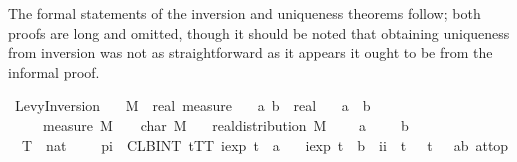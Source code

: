 \documentclass[leqno]{article}
\theoremstyle{definition}
\begin{document}
\medskip

The formal statements of the inversion and uniqueness theorems follow; both proofs are long and omitted, though it should be noted that obtaining uniqueness from inversion was not as straightforward as it appears it ought to be from the informal proof.

\medskip

\begin{isabellebody}
\isamarkupfalse%
\ Levy{\isacharunderscore}Inversion{\isacharcolon}\isanewline
\ \ \ M\ {\isacharcolon}{\isacharcolon}\ {\isachardoublequoteopen}real\ measure{\isachardoublequoteclose}\isanewline
\ \ \ a\ b\ {\isacharcolon}{\isacharcolon}\ real\isanewline
\ \ \ {\isachardoublequoteopen}a\ {\isasymle}\ b{\isachardoublequoteclose}\isanewline
\ \ \ {\isachardoublequoteopen}{\isasymmu}\ {\isasymequiv}\ measure\ M{\isachardoublequoteclose}\ \ {\isachardoublequoteopen}{\isasymphi}\ {\isasymequiv}\ char\ M{\isachardoublequoteclose}\isanewline
\ \ \ {\isachardoublequoteopen}real{\isacharunderscore}distribution\ M{\isachardoublequoteclose}\isanewline
\ \ \ {\isachardoublequoteopen}{\isasymmu}\ {\isacharbraceleft}a{\isacharbraceright}\ {\isacharequal}\ {}{\isachardoublequoteclose}\ \ {\isachardoublequoteopen}{\isasymmu}\ {\isacharbraceleft}b{\isacharbraceright}\ {\isacharequal}\ {}{\isachardoublequoteclose}\isanewline
\ \ \isanewline
\ \ {\isachardoublequoteopen}{\isacharparenleft}{\isacharparenleft}{\isasymlambda}T\ {\isacharcolon}{\isacharcolon}\ nat{\isachardot}\ {}\ {\isacharslash}\ {\isacharparenleft}{}\ {\isacharasterisk}\ pi{\isacharparenright}\ {\isacharasterisk}\ {\isacharparenleft}CLBINT\ t{\isacharequal}{\isacharminus}T{\isachardot}{\isachardot}T{\isachardot}\ {\isacharparenleft}iexp\ {\isacharparenleft}{\isacharminus}{\isacharparenleft}t\ {\isacharasterisk}\ a{\isacharparenright}{\isacharparenright}\ {\isacharminus}\isanewline
\ \ iexp\ {\isacharparenleft}{\isacharminus}{\isacharparenleft}t\ {\isacharasterisk}\ b{\isacharparenright}{\isacharparenright}{\isacharparenright}\ {\isacharslash}\ {\isacharparenleft}ii\ {\isacharasterisk}\ t{\isacharparenright}\ {\isacharasterisk}\ {\isasymphi}\ t{\isacharparenright}{\isacharparenright}\ {\isacharminus}{\isacharminus}{\isacharminus}{\isachargreater}\ {\isasymmu}\ {\isacharbraceleft}a{\isacharless}{\isachardot}{\isachardot}b{\isacharbraceright}{\isacharparenright}\ at{\isacharunderscore}top{\isachardoublequoteclose}\isanewline

\end{isabellebody}
\end{document}
